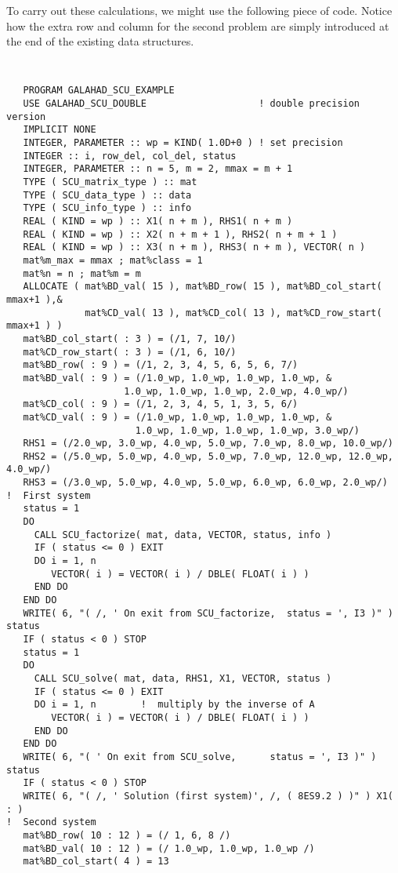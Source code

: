 \documentclass{galahad}
\begin{document}
To carry out these calculations, we might use the following piece of code. 
Notice how the extra row and column for the second problem are 
simply introduced at the end of the existing data structures. 
{\tt
\begin{verbatim}
   PROGRAM GALAHAD_SCU_EXAMPLE 
   USE GALAHAD_SCU_DOUBLE                    ! double precision version
   IMPLICIT NONE 
   INTEGER, PARAMETER :: wp = KIND( 1.0D+0 ) ! set precision
   INTEGER :: i, row_del, col_del, status 
   INTEGER, PARAMETER :: n = 5, m = 2, mmax = m + 1 
   TYPE ( SCU_matrix_type ) :: mat 
   TYPE ( SCU_data_type ) :: data 
   TYPE ( SCU_info_type ) :: info 
   REAL ( KIND = wp ) :: X1( n + m ), RHS1( n + m )
   REAL ( KIND = wp ) :: X2( n + m + 1 ), RHS2( n + m + 1 )
   REAL ( KIND = wp ) :: X3( n + m ), RHS3( n + m ), VECTOR( n ) 
   mat%m_max = mmax ; mat%class = 1 
   mat%n = n ; mat%m = m 
   ALLOCATE ( mat%BD_val( 15 ), mat%BD_row( 15 ), mat%BD_col_start( mmax+1 ),& 
              mat%CD_val( 13 ), mat%CD_col( 13 ), mat%CD_row_start( mmax+1 ) ) 
   mat%BD_col_start( : 3 ) = (/1, 7, 10/) 
   mat%CD_row_start( : 3 ) = (/1, 6, 10/) 
   mat%BD_row( : 9 ) = (/1, 2, 3, 4, 5, 6, 5, 6, 7/) 
   mat%BD_val( : 9 ) = (/1.0_wp, 1.0_wp, 1.0_wp, 1.0_wp, & 
                     1.0_wp, 1.0_wp, 1.0_wp, 2.0_wp, 4.0_wp/) 
   mat%CD_col( : 9 ) = (/1, 2, 3, 4, 5, 1, 3, 5, 6/) 
   mat%CD_val( : 9 ) = (/1.0_wp, 1.0_wp, 1.0_wp, 1.0_wp, & 
                       1.0_wp, 1.0_wp, 1.0_wp, 1.0_wp, 3.0_wp/) 
   RHS1 = (/2.0_wp, 3.0_wp, 4.0_wp, 5.0_wp, 7.0_wp, 8.0_wp, 10.0_wp/) 
   RHS2 = (/5.0_wp, 5.0_wp, 4.0_wp, 5.0_wp, 7.0_wp, 12.0_wp, 12.0_wp, 4.0_wp/) 
   RHS3 = (/3.0_wp, 5.0_wp, 4.0_wp, 5.0_wp, 6.0_wp, 6.0_wp, 2.0_wp/) 
!  First system 
   status = 1 
   DO 
     CALL SCU_factorize( mat, data, VECTOR, status, info ) 
     IF ( status <= 0 ) EXIT 
     DO i = 1, n 
        VECTOR( i ) = VECTOR( i ) / DBLE( FLOAT( i ) ) 
     END DO 
   END DO 
   WRITE( 6, "( /, ' On exit from SCU_factorize,  status = ', I3 )" ) status 
   IF ( status < 0 ) STOP 
   status = 1 
   DO 
     CALL SCU_solve( mat, data, RHS1, X1, VECTOR, status ) 
     IF ( status <= 0 ) EXIT 
     DO i = 1, n        !  multiply by the inverse of A 
        VECTOR( i ) = VECTOR( i ) / DBLE( FLOAT( i ) ) 
     END DO 
   END DO 
   WRITE( 6, "( ' On exit from SCU_solve,      status = ', I3 )" ) status 
   IF ( status < 0 ) STOP 
   WRITE( 6, "( /, ' Solution (first system)', /, ( 8ES9.2 ) )" ) X1( : ) 
!  Second system 
   mat%BD_row( 10 : 12 ) = (/ 1, 6, 8 /) 
   mat%BD_val( 10 : 12 ) = (/ 1.0_wp, 1.0_wp, 1.0_wp /) 
   mat%BD_col_start( 4 ) = 13 

\end{verbatim}}
\end{document}
